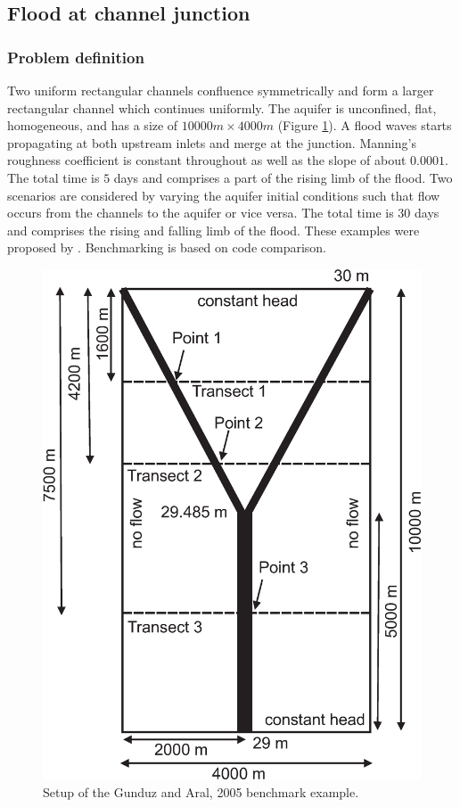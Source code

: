 \subsection{Flood at channel junction}
%
\subsubsection*{Problem definition}
%
Two uniform rectangular channels confluence symmetrically and form a larger rectangular channel which continues uniformly. The aquifer is
unconfined, flat, homogeneous, and has a size of $10000m\times 4000m$ (Figure \ref{coup:riverJunction_setup}).
A flood waves starts propagating at both upstream inlets and merge at the junction. Manning's roughness coefficient is constant throughout as well as the slope of about $0.0001$.
The total time is $5$ days and comprises a part of the rising limb of the flood.
Two scenarios are considered by varying the aquifer initial conditions such that flow occurs from the channels to the aquifer or vice versa. The total time is $30$ days and comprises the rising and falling limb of the flood.
These examples were proposed by \cite{Gunduz:05}. Benchmarking is based on code comparison.
%
\begin{figure} [htb!]
 \centering
 \includegraphics[width=0.75\columnwidth] {H_COUP/figures/riverJunction_setup.eps}
 \caption{Setup of the Gunduz and Aral, 2005 \cite{Gunduz:05} benchmark example.}
 \label{coup:riverJunction_setup}
\end{figure}
%
%
